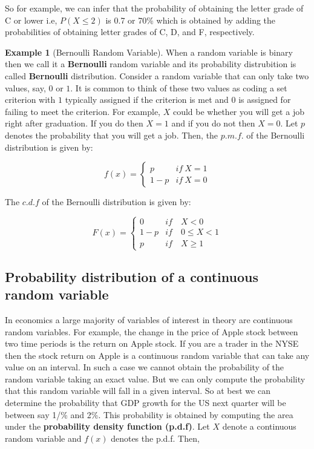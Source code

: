 \documentclass[
]{book}
\theoremstyle{definition}
\theoremstyle{definition}
\newtheorem{example}{Example}[chapter]
\theoremstyle{definition}
\theoremstyle{definition}
\theoremstyle{remark}
\begin{document}
So for example, we can infer that the probability of obtaining the letter grade of C or lower i.e, \(P(X\leq 2)\) is 0.7 or 70\% which is obtained by adding the probabilities of obtaining letter grades of C, D, and F, respectively.

\begin{example}[Bernoulli Random Variable]
\protect\hypertarget{exm:unnamed-chunk-74}{}\label{exm:unnamed-chunk-74}When a random variable is binary then we call it a \textbf{Bernoulli} random variable and its probability distrubition is called \textbf{Bernoulli} distribution. Consider a random variable that can only take two values, say, \(0\) or \(1\). It is common to think of these two values as coding a set criterion with \(1\) typically assigned if the criterion is met and \(0\) is assigned for failing to meet the criterion. For example, \(X\) could be whether you will get a job right after graduation. If you do then \(X=1\) and if you do not then \(X=0\). Let \(p\) denotes the probability that you will get a job. Then, the \(p.m.f.\) of the Bernoulli distribution is given by:

\[f(x)=\begin{cases}
    p & if \ X=1\\
    1-p & if \ X=0
     \end{cases}\]

The \(c.d.f\) of the Bernoulli distribution is given by:

\[F(x)=\begin{cases}
    0 & if \quad X < 0\\
    1-p & if \quad 0\leq X<1\\
    p & if \quad  X\geq 1
     \end{cases}\]
\end{example}

\hypertarget{probability-distribution-of-a-continuous-random-variable}{%
\subsection{Probability distribution of a continuous random variable}\label{probability-distribution-of-a-continuous-random-variable}}

In economics a large majority of variables of interest in theory are continuous random variables. For example, the change in the price of Apple stock between two time periods is the return on Apple stock. If you are a trader in the NYSE then the stock return on Apple is a continuous random variable that can take any value on an interval. In such a case we cannot obtain the probability of the random variable taking an exact value. But we can only compute the probability that this random variable will fall in a given interval. So at best we can determine the probability that GDP growth for the US next quarter will be between say 1/\% and 2\%. This probability is obtained by computing the area under the \textbf{probability density function (p.d.f)}. Let \(X\) denote a continuous random variable and \(f(x)\) denotes the p.d.f. Then,
\end{document}

